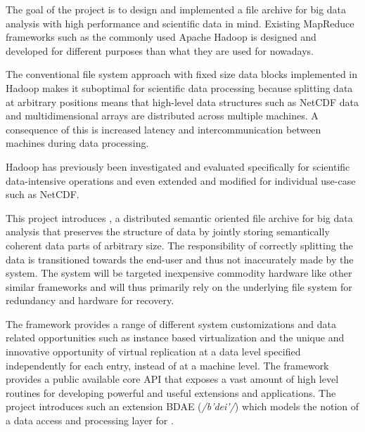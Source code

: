 The goal of the project is to design and implemented a file archive for big data analysis with high performance and scientific data in mind. Existing MapReduce\cite{Dean:2008:MSD:1327452.1327492} frameworks such as the commonly used Apache Hadoop\cite{PageHadoop} is designed and developed for different purposes than what they are used for nowadays. 

The conventional file system approach with fixed size data blocks implemented in Hadoop makes it suboptimal for scientific data processing because splitting data at arbitrary positions means that high-level data structures such as NetCDF data and multidimensional arrays are distributed across multiple machines. A consequence of this is increased latency and intercommunication between machines during data processing.
\newline

Hadoop has previously been investigated and evaluated speci\-fically for scientific data-intensive operations\cite{fadika2012evaluating} and even extended and modified for individual use-case such as NetCDF\cite{buck2011scihadoop}.
\newline

This project introduces \CodeNameShort, a distributed semantic oriented file archive for big data analysis that preserves the structure of data by jointly storing semantically coherent data parts of arbitrary size. The responsibility of correctly splitting the data is transitioned towards the end-user and thus not inaccurately made by the system. The system will be targeted inexpensive commodity hardware like other similar frameworks and will thus primarily rely on the underlying file system for redundancy and hardware for recovery.
\newline

The \CodeName framework provides a range of different system customizations and data related opportunities such as instance based virtualization and the unique and innovative opportunity of virtual replication at a data level specified independently for each entry, 	instead of at a machine level. The framework provides a public available core API that exposes a vast amount of high level routines for developing powerful and useful extensions and applications. The project introduces such an extension BDAE (\textit{/b'dei'/}) which models the notion of a data access and processing layer for \CodeNameShort.

